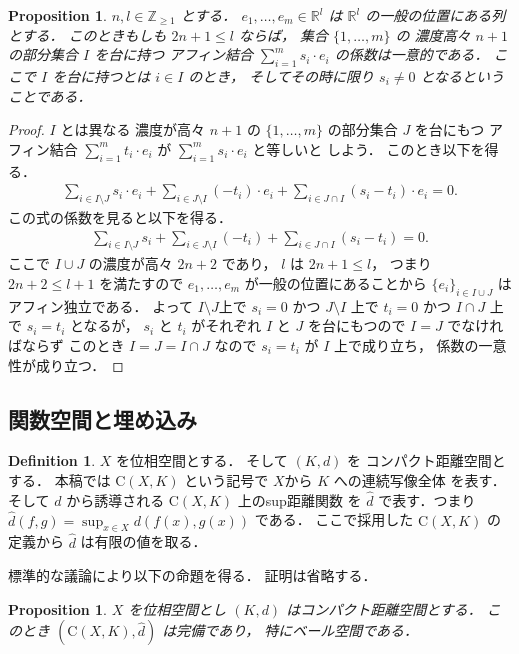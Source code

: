 \documentclass[leqno, a4paper, 12pt]{jsarticle}
\theoremstyle{plain}
\newtheorem{prop}[thm]{Proposition}
\theoremstyle{definition}
\newtheorem{df}{Definition}[section]
\theoremstyle{remark}
\newcommand{\zz}{\mathbb{Z}}
\newcommand{\rr}{\mathbb{R}}
\newcommand{\yosupmet}[1]{\widehat{#1}}
\newcommand{\yofuncsp}[2]{\mathrm{C}(#1, #2)}
\numberwithin{equation}{section}
\begin{document}
\begin{prop}\label{prop:n+1inde}
$n, l\in \zz_{\ge 1}$
とする．
$e_{1}, \dots, e_{m}\in \rr^{l}$
は
$\rr^{l}$
の一般の位置にある列とする．
このときもしも
$2n+1\le l$
ならば，
集合
$\{1, \dots, m\}$
の
濃度高々
$n+1$
の部分集合
$I$
を台に持つ
アフィン結合
$\sum_{i=1}^{m}s_{i}\cdot e_{i}$
の係数は一意的である．
ここで
$I$
を台に持つとは
$i\in I$
のとき，
そしてその時に限り
$s_{i}\neq 0$
となるということである．
\end{prop}
\begin{proof}
$I$
とは異なる
濃度が高々
$n+1$
の
$\{1, \dots, m\}$
の部分集合
$J$
を台にもつ
アフィン結合
$\sum_{i=1}^{m}t_{i}\cdot e_{i}$
が
$\sum_{i=1}^{m}s_{i}\cdot e_{i}$
と等しいと
しよう．
このとき以下を得る．
\begin{align}
\sum_{i\in I\setminus J}s_{i}\cdot e_{i}
+
\sum_{i\in J\setminus I}(-t_{i})\cdot e_{i}
+
\sum_{i\in J\cap I}(s_{i}-t_{i})\cdot e_{i}
=0. 
\end{align}
この式の係数を見ると以下を得る．
\begin{align}
\sum_{i\in I\setminus J}s_{i}
+
\sum_{i\in J\setminus I}(-t_{i})
+
\sum_{i\in J\cap I}(s_{i}-t_{i})
=0. 
\end{align}
ここで
$I\cup J$
の濃度が高々
$2n+2$
であり，
$l$
は
$2n+1\le l$，
つまり
$2n+2\le l+1$
を満たすので
$e_{1}, \dots, e_{m}$
が一般の位置にあることから
$\{e_{i}\}_{i\in I\cup J}$
はアフィン独立である．
よって
$I\setminus J$上で
$s_{i}=0$
かつ
$J\setminus I$
上で
$t_{i}=0$
かつ
$I\cap J$
上で
$s_{i}=t_{i}$
となるが，
$s_{i}$
と
$t_{i}$
がそれぞれ
$I$
と
$J$
を台にもつので
$I=J$
でなければならず
このとき
$I=J=I\cap J$
なので
$s_{i}=t_{i}$
が
$I$
上で成り立ち，
係数の一意性が成り立つ．
\end{proof}


\subsection{関数空間と埋め込み}\label{subsec:funcsp}
\begin{df}
$X$
を位相空間とする．
そして
$(K,  d)$
を
コンパクト距離空間とする．
本稿では
$\yofuncsp{X}{K}$
という記号で
$X$から
$K$
への連続写像全体
を表す．
そして
$d$
から誘導される
$\yofuncsp{X}{K}$
上のsup距離関数
を
$\yosupmet{d}$
で表す．つまり
$\yosupmet{d}(f, g)=\sup_{x\in X}d(f(x), g(x))$
である．
ここで採用した
$\yofuncsp{X}{K}$
の定義から
$\yosupmet{d}$
は有限の値を取る．
\end{df}

標準的な議論により以下の命題を得る．
証明は省略する．
\begin{prop}\label{prop:funccomp}
$X$
を位相空間とし
$(K, d)$
はコンパクト距離空間とする．
このとき
$(\yofuncsp{X}{K}, \yosupmet{d})$
は完備であり，
特にベール空間である．
\end{prop}
\end{document}
